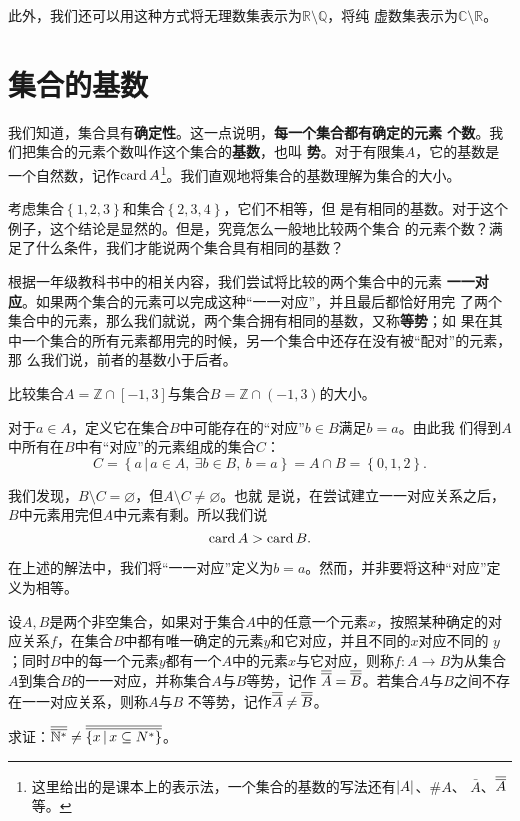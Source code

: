 此外，我们还可以用这种方式将无理数集表示为$\mathbb{R}\setminus\mathbb{Q}$，将纯
虚数集表示为$\mathbb{C}\setminus\mathbb{R}$。

\section{集合的基数}

我们知道，集合具有\textbf{确定性}。这一点说明，\textbf{每一个集合都有确定的元素
个数}。我们把集合的元素个数叫作这个集合的\textbf{基数}，也叫
\textbf{势}。对于有限集$A$，它的基数是一个自然数，记作$\operatorname{card}{A}
$\footnote{这里给出的是课本上的表示法，一个集合的基数的写法还有$\left|{A}\right|$、$\# A$、
$\bar{A}$、$\overline{\overline{{A}}}$等。}。我们直观地将集合的基数理解为集合的大小。

考虑集合$\left\{ 1,2,3 \right\} $和集合$\left\{ 2,3,4 \right\} $，它们不相等，但
是有相同的基数。对于这个例子，这个结论是显然的。但是，究竟怎么一般地比较两个集合
的元素个数？满足了什么条件，我们才能说两个集合具有相同的基数？

根据一年级教科书中的相关内容\cite{pep_math_1A}，我们尝试将比较的两个集合中的元素
\textbf{一一对应}。如果两个集合的元素可以完成这种“一一对应”，并且最后都恰好用完
了两个集合中的元素，那么我们就说，两个集合拥有相同的基数，又称\textbf{等势}；如
果在其中一个集合的所有元素都用完的时候，另一个集合中还存在没有被“配对”的元素，那
么我们说，前者的基数小于后者。

\begin{rawexp}
    比较集合$A=\mathbb{Z}\cap \left[ -1,3 \right]$与集合$B=\mathbb{Z}\cap \left( 
    -1,3\right)$的大小。
\end{rawexp}

\begin{rawsol}
    对于$a \in A$，定义它在集合$B$中可能存在的“对应”$b \in B$满足$b = a$。由此我
    们得到$A$中所有在$B$中有“对应”的元素组成的集合$C$：
    \[
        C = \left\{a\,|\,a\in A,\ \exists b\in B,\ b=a\right\} = A\cap B = 
        \left\{ 0,1,2 \right\} .
    \]

    我们发现，$B\setminus C=\varnothing$，但$A\setminus C\neq\varnothing$。也就
    是说，在尝试建立一一对应关系之后，$B$中元素用完但$A$中元素有剩。所以我们说
    \[
        \operatorname{card}{A} > \operatorname{card}{B}.
    \]
\end{rawsol}

在上述的解法中，我们将“一一对应”定义为$b=a$。然而，并非要将这种“对应”定义为相等。

\begin{rawexp}[2024年台州二模T19节选]
    设$A,B$是两个非空集合，如果对于集合$A$中的任意一个元素$x$，按照某种确定的对
    应关系$f$，在集合$B$中都有唯一确定的元素$y$和它对应，并且不同的$x$对应不同的
    $y$；同时$B$中的每一个元素$y$都有一个$A$中的元素$x$与它对应，则称$f:
    A\rightarrow B$为从集合$A$到集合$B$的一一对应，并称集合$A$与$B$等势，记作
    $\overline{\overline{{A}}}=\overline{\overline{{B}}}$。若集合$A$与$B$之间不存在一一对应关系，则称$A$与$B$
    不等势，记作$\overline{\overline{{A}}}\neq\overline{\overline{{B}}}$。

    \vspace{1ex}
    求证：$\overline{\overline{{\mathbb{N}^\ast}}} \neq \overline{\overline{{\left\{ x\,|\, x\subseteq N^\ast 
    \right\}}}} $。
\end{rawexp}


